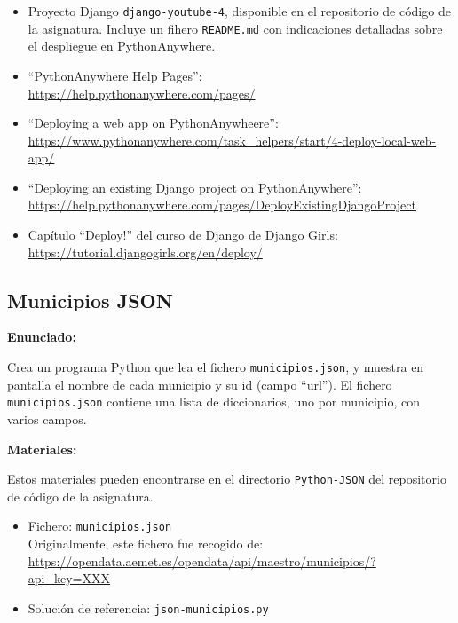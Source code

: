 \begin{itemize}
\item Proyecto Django \verb|django-youtube-4|, disponible en el repositorio de código de la asignatura. Incluye un fihero \verb|README.md| con indicaciones detalladas sobre el despliegue en PythonAnywhere.
\item ``PythonAnywhere Help Pages'': \\
  \url{https://help.pythonanywhere.com/pages/}
\item ``Deploying a web app on PythonAnywheere'': \\
  \url{https://www.pythonanywhere.com/task_helpers/start/4-deploy-local-web-app/}
\item ``Deploying an existing Django project on PythonAnywhere'': \\
  \url{https://help.pythonanywhere.com/pages/DeployExistingDjangoProject}
\item Capítulo ``Deploy!'' del curso de Django de Django Girls: \\
  \url{https://tutorial.djangogirls.org/en/deploy/}
\end{itemize}

\subsection{Municipios JSON}
\label{subsec:json-municipios}

\textbf{Enunciado:}

Crea un programa Python que lea el fichero \verb|municipios.json|,
y muestra en pantalla el nombre de cada municipio y su id (campo ``url'').
El fichero \verb|municipios.json| contiene una lista de diccionarios,
uno por municipio, con varios campos.

\textbf{Materiales:}

Estos materiales pueden encontrarse en el
directorio \verb|Python-JSON| del repositorio de código de la
asignatura. 

\begin{itemize}
\item Fichero: \verb|municipios.json| \\
  Originalmente, este fichero fue recogido de: \\
  \url{https://opendata.aemet.es/opendata/api/maestro/municipios/?api_key=XXX}
\item Solución de referencia: \verb|json-municipios.py|
\end{itemize}

